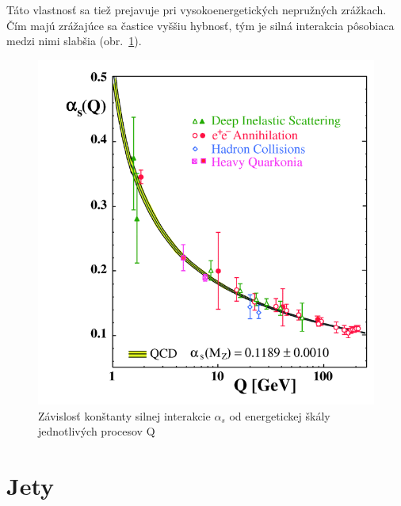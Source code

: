 \documentclass[thesismargins, thesislinespacing]{rnthesis}
\begin{document}
Táto vlastnosť sa tiež prejavuje pri vysokoenergetických nepružných zrážkach. Čím majú zrážajúce sa častice vyššiu hybnosť, tým je silná interakcia pôsobiaca medzi nimi slabšia (obr.~\ref{alfa}).
\begin{figure}
	\centering
	\includegraphics[scale=0.3]{./Obrazky_praca/zrazka.png}
	\caption{Závislosť konštanty silnej interakcie $\alpha_s$ od energetickej škály jednotlivých procesov Q \cite{3}}
	\label{alfa}
\end{figure}

\section{Jety}
\end{document}
